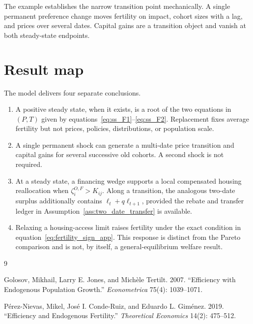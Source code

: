 \documentclass[11pt]{article}
\theoremstyle{definition}
\theoremstyle{remark}
\begin{document}
The example establishes the narrow transition point mechanically.  A single
permanent preference change moves fertility on impact, cohort sizes with a lag,
and prices over several dates.  Capital gains are a transition object and
vanish at both steady-state endpoints.

\section{Result map}

The model delivers four separate conclusions.
\begin{enumerate}
 \item A positive steady state, when it exists, is a root of the two equations
 in $(P,T)$ given by equations~\eqref{eq:ss_F1}--\eqref{eq:ss_F2}.  Replacement
 fixes average fertility but not prices, policies, distributions, or population
 scale.
 \item A single permanent shock can generate a multi-date price transition and
 capital gains for several successive old cohorts.  A second shock is not
 required.
 \item At a steady state, a financing wedge supports a local compensated
 housing reallocation when $\zeta_i^{O,F}>K_{ij}$.  Along a transition, the
 analogous two-date surplus additionally contains $\ell_t+q\ell_{t+1}$, provided
 the rebate and transfer ledger in Assumption~\ref{ass:two_date_transfer} is
 available.
 \item Relaxing a housing-access limit raises fertility under the exact
 condition in equation~\eqref{eq:fertility_sign_app}.  This response is distinct
 from the Pareto comparison and is not, by itself, a general-equilibrium welfare
 result.
\end{enumerate}

\begin{thebibliography}{9}
\small
\setlength{\itemsep}{2pt}

Golosov, Mikhail, Larry E. Jones, and Mich\`ele Tertilt. 2007.
``Efficiency with Endogenous Population Growth.''
\emph{Econometrica} 75(4): 1039--1071.

P\'erez-Nievas, Mikel, Jos\'e I. Conde-Ruiz, and Eduardo L. Gim\'enez. 2019.
``Efficiency and Endogenous Fertility.''
\emph{Theoretical Economics} 14(2): 475--512.

\end{thebibliography}
\end{document}
